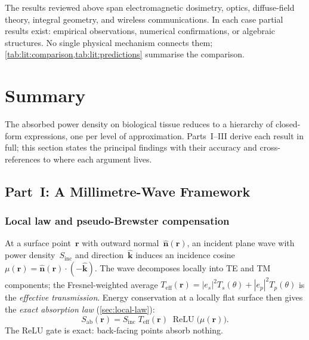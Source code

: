 \documentclass[11pt,a4paper]{article}
\theoremstyle{definition}      %
\newcommand{\khat}{\hat{\bm{k}}}
\newcommand{\nhat}{\hat{\bm{n}}}
\newcommand{\rr}{\mathbf{r}}
\newcommand{\Sinc}{S_{\mathrm{inc}}}
\newcommand{\Sab}{S_{\mathrm{ab}}}
\newcommand{\Teff}{T_{\mathrm{eff}}}
\DeclareMathOperator{\ReLU}{ReLU}
\begin{document}

The results reviewed above span electromagnetic dosimetry, optics,
diffuse-field theory, integral geometry, and wireless communications.
In each case partial results exist: empirical observations, numerical
confirmations, or algebraic structures.
No single physical mechanism connects them;
\cref{tab:lit:comparison,tab:lit:predictions} summarise the
comparison.


\section{Summary}\label{sec:summary}

The absorbed power density on biological tissue reduces to a hierarchy of
closed-form expressions, one per level of approximation.
Parts~I--III derive each result in full; this section states the principal
findings with their accuracy and cross-references to where each argument lives.

\subsection{Part~I: A Millimetre-Wave Framework}
\label{sum:part1}

\subsubsection*{Local law and pseudo-Brewster compensation}

At a surface point~$\rr$ with outward normal~$\nhat(\rr)$, an incident
plane wave with power density~$\Sinc$ and direction~$\khat$ induces an
incidence cosine $\mu(\rr)=\nhat(\rr)\cdot(-\khat)$.
The wave decomposes locally into TE and TM components; the Fresnel-weighted
average $\Teff(\rr)=|e_s|^2T_s(\theta)+|e_p|^2T_p(\theta)$ is the
\emph{effective transmission}.
Energy conservation at a locally flat surface then gives the
\emph{exact absorption law} (\cref{sec:local-law}):
\begin{equation}\label{sum:eq:Sab-exact}
  \boxed{\Sab(\rr) = \Sinc\;\Teff(\rr)\;\ReLU\!\bigl(\mu(\rr)\bigr).}
\end{equation}
The ReLU gate is exact: back-facing points absorb nothing.
\end{document}
